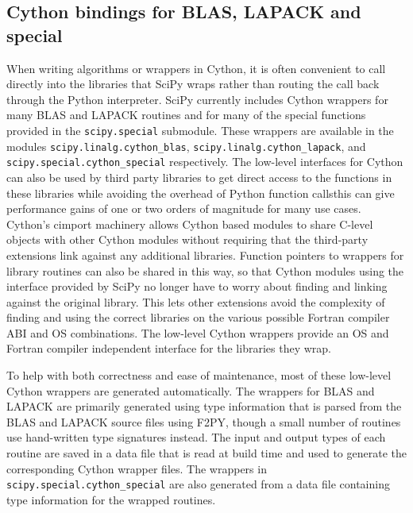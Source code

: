 \documentclass[fleqn,10pt]{wlscirep}
\begin{document}
\subsection*{Cython bindings for BLAS, LAPACK and special}

When writing algorithms or wrappers in Cython\cite{behnel2011cython}, it is often convenient to call directly into the libraries that SciPy wraps rather than routing the call back through the Python interpreter.
SciPy currently includes Cython wrappers\cite{blas-lapack-wrappers-scipy-2015} for many BLAS and LAPACK\cite{LAPACK} routines and for many of the special functions provided in the \texttt{scipy.{\allowbreak}special} submodule.
These wrappers are available in the modules \texttt{scipy.{\allowbreak}linalg.{\allowbreak}cython\_blas}, \texttt{scipy.{\allowbreak}linalg.{\allowbreak}cython\_lapack}, and \texttt{scipy.{\allowbreak}special.{\allowbreak}cython\_special} respectively.
The low-level interfaces for Cython can also be used by third party libraries to get direct access to the functions in these libraries while avoiding the overhead of Python function calls{\textemdash}this can give performance gains of one or two orders of magnitude for many use cases.
Cython's cimport machinery allows Cython based modules to share C-level objects with other Cython modules without requiring that the third-party extensions link against any additional libraries.
Function pointers to wrappers for library routines can also be shared in this way, so that Cython modules using the interface provided by SciPy no longer have to worry about finding and linking against the original library.
This lets other extensions avoid the complexity of finding and using the correct libraries on the various possible Fortran compiler ABI and OS combinations.
The low-level Cython wrappers provide an OS and Fortran compiler independent interface for the libraries they wrap.

To help with both correctness and ease of maintenance, most of these low-level Cython wrappers are generated automatically.
The wrappers for BLAS and LAPACK are primarily generated using type information that is parsed from the BLAS and LAPACK source files using F2PY\cite{peterson2009f2py}, though a small number of routines use hand-written type signatures instead.
The input and output types of each routine are saved in a data file that is read at build time and used to generate the corresponding Cython wrapper files.
The wrappers in \texttt{scipy.{\allowbreak}special.{\allowbreak}cython\_special} are also generated from a data file containing type information for the wrapped routines.
\end{document}
